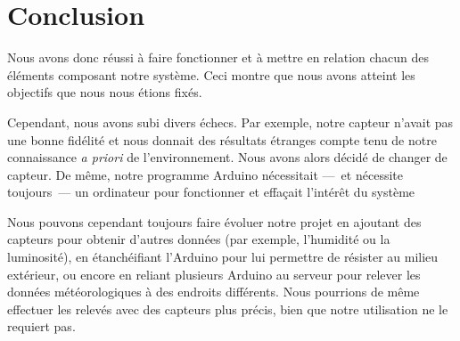 \chapter*{Conclusion}

Nous avons donc réussi à faire fonctionner et à mettre en relation chacun des éléments composant notre système. Ceci montre que nous avons atteint les objectifs que nous nous étions fixés.

Cependant, nous avons subi divers échecs. Par exemple, notre capteur n'avait pas une bonne fidélité et nous donnait des résultats étranges compte tenu de notre connaissance \emph{a priori} de l'environnement. Nous avons alors décidé de changer de capteur. De même, notre programme Arduino nécessitait ---~et nécessite toujours~--- un ordinateur pour fonctionner et effaçait l'intérêt du système

Nous pouvons cependant toujours faire évoluer notre projet en ajoutant des capteurs pour obtenir d'autres données (par exemple, l'humidité ou la luminosité), en étanchéifiant l'Arduino pour lui permettre de résister au milieu extérieur, ou encore en reliant plusieurs Arduino au serveur pour relever les données météorologiques à des endroits différents. Nous pourrions de même effectuer les relevés avec des capteurs plus précis, bien que notre utilisation ne le requiert pas.
